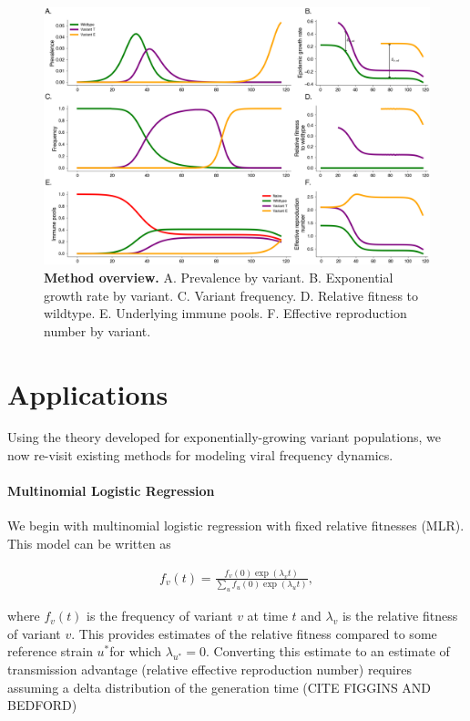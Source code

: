 \documentclass[12pt,oneside,letterpaper]{article}
\begin{document}
\begin{figure}[h]
    \centering
    \includegraphics[width=0.8\linewidth]{../notebooks/figures/vis_mechanisms.png}
    \caption{\textbf{Method overview.} 
    A. Prevalence by variant.
    B. Exponential growth rate by variant.
    C. Variant frequency.
    D. Relative fitness to wildtype.
    E. Underlying immune pools.
    F. Effective reproduction number by variant.
}%
    \label{fig:vis_mechanisms}
\end{figure}

\section*{Applications}

Using the theory developed for exponentially-growing variant populations, we now re-visit existing methods for modeling viral frequency dynamics.

\paragraph{Multinomial Logistic Regression}%

We begin with multinomial logistic regression with fixed relative fitnesses (MLR).
This model can be written as

\begin{align*}
    f_{v}(t) = \frac{f_{v}(0) \exp(\lambda_{v} t)}{\sum_{u} f_{u}(0) \exp(\lambda_{u} t)},
\end{align*}

where $f_{v}(t)$ is the frequency of variant $v$ at time $t$ and $\lambda_{v}$ is the relative fitness of variant $v$.
This provides estimates of the relative fitness compared to some reference strain $u^{*}$for which $\lambda_{u^*} = 0$.
Converting this estimate to an estimate of transmission advantage (relative effective reproduction number) requires assuming a delta distribution of the generation time (CITE FIGGINS AND BEDFORD)
\end{document}

